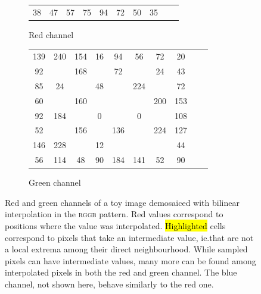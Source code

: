 \documentclass{ipol}
\begin{document}
\begin{figure}[ht]
\begin{subfigure}[t]{.5\linewidth}
\begin{tabular}{cccccccccc}
                        \textcolor{c2}{38} & \textcolor{c2}{47} & \textcolor{c2}{57} & \textcolor{c2}{75} & \textcolor{c2}{94} & \textcolor{c2}{72} & \textcolor{c2}{50} & \textcolor{c2}{35}\\
                \end{tabular}
                \caption{Red channel}
        \end{subfigure}\hfill%
        \begin{subfigure}[t]{.5\linewidth}
                \centering
                \begin{tabular}{cccccccccc}
                    \textcolor{c2}{139} & 240 & \textcolor{c2}{154} & 16 & \textcolor{c2}{94} & 56 & \textcolor{c2}{72} & 20\\
                    92 & \cellcolor{c0!50}{\textcolor{c2}{131}} & 168 & \cellcolor{c0!50}{\textcolor{c2}{76}} & 72 & \cellcolor{c0!50}{\textcolor{c2}{94}} & 24 & \textcolor{c2}{43}\\
                    \textcolor{c2}{85} & 24 & \cellcolor{c0!50}{\textcolor{c2}{100}} & 48 & \cellcolor{c0!50}{\textcolor{c2}{102}} & 224 & \cellcolor{c0!50}{\textcolor{c2}{130}} & 72\\
                    60 & \cellcolor{c0!50}{\textcolor{c2}{107}} & 160 & \cellcolor{c0!50}{\textcolor{c2}{68}} & \cellcolor{c0!50}{64} & \cellcolor{c0!50}{\textcolor{c2}{122}} & 200 & \textcolor{c2}{153}\\
                    \textcolor{c2}{92} & 184 & \cellcolor{c0!50}{\textcolor{c2}{125}} & 0 & \cellcolor{c0!50}{\textcolor{c2}{50}} & 0 & \cellcolor{c0!50}{\textcolor{c2}{133}} & 108\\
                    52 & \cellcolor{c0!50}{\textcolor{c2}{155}} & 156 & \cellcolor{c0!50}{\textcolor{c2}{76}} & 136 & \cellcolor{c0!50}{\textcolor{c2}{117}} & 224 & \textcolor{c2}{127}\\
                    \textcolor{c2}{146} & 228 & \cellcolor{c0!50}{\textcolor{c2}{111}} & 12 & \cellcolor{c0!50}{\textcolor{c2}{110}} & \cellcolor{c0!50}{108} & \cellcolor{c0!50}{\textcolor{c2}{107}} & 44\\
                    56 & \textcolor{c2}{114} & 48 & \textcolor{c2}{90} & 184 & \textcolor{c2}{141} & 52 & \textcolor{c2}{90}\\
                \end{tabular}
                \caption{Green channel}
        \end{subfigure}
        \label{fig:intermediate_values}
        \caption{Red and green channels of a toy image demosaiced with bilinear interpolation in the \textsc{rggb} pattern. \textcolor{c2}{Red values} correspond to positions where the value was interpolated. \hl{Highlighted} cells correspond to pixels that take an intermediate value, ie.\@ that are not a local extrema among their direct neighbourhood. While sampled pixels can have intermediate values, many more can be found among \textcolor{c3}{interpolated pixels} in both the red and green channel. The blue channel, not shown here, behave similarly to the red one.}
\end{figure}
\end{document}
